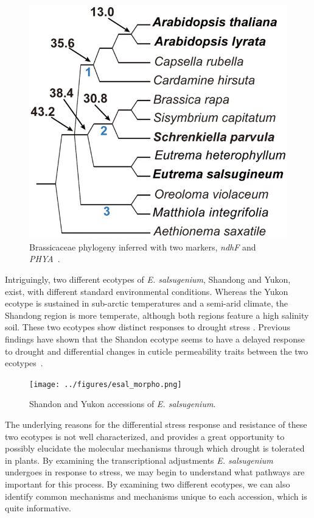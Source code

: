 \documentclass[12pt]{article}
\newcommand{\esal}{\textit{E. salsugenium}}
\begin{document}
		\begin{figure}[H]
			\centering
			\includegraphics[scale=2]{../figures/esal_phylo.jpg}
			\caption[Brassicaceae Phylogeny]{Brassicaceae phylogeny inferred with two markers, \textit{ndhF} and \textit{PHYA}~\cite{yang2013reference}.}
			\label{phylo}
		\end{figure}
		
	Intriguingly, two different ecotypes of \esal{}, Shandong and Yukon, exist, with different standard environmental conditions. Whereas the Yukon ecotype is sustained in sub-arctic temperatures and a semi-arid climate, the Shandong region is more temperate, although both regions feature a high salinity soil. These two ecotypes show distinct responses to drought stress \cite{xu2014leaf}. Previous findings have shown that the Shandon ecotype seems to have a delayed response to drought and differential changes in cuticle permeability traits between the two ecotypes~\cite{macleod2015exposure}. 
	
		\begin{figure}[H]
			\centering
			\texttt{[image: ../figures/esal\_morpho.png]}
			\caption[Shandong and Yukon ecotype morphology]{Shandon and Yukon accessions of \esal{}.}
			\label{morpho}
		\end{figure}
		
	The underlying reasons for the differential stress response and resistance of these two ecotypes is not well characterized, and provides a great opportunity to possibly elucidate the molecular mechanisms through which drought is tolerated in plants. By examining the transcriptional adjustments \esal{} undergoes in response to stress, we may begin to understand what pathways are important for this process. By examining two different ecotypes, we can also identify common mechanisms and mechanisms unique to each accession, which is quite informative. 
	
\end{document}

